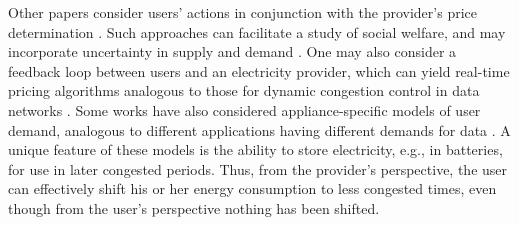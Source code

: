 
Other papers consider users' actions in conjunction with the provider's price determination \cite{borenstein2002dynamic}. Such approaches can facilitate a study of social welfare, and may incorporate uncertainty in supply and demand \cite{brunekreeft2000price,chao1983peak,samadi2010optimal}. One may also consider a feedback loop between users and an electricity provider, which can yield real-time pricing algorithms analogous to those for dynamic congestion control in data networks \cite{roozbehani2010dynamic}.
Some works have also considered appliance-specific models of user demand, analogous to different applications having different demands for data \cite{li2011optimal}. A unique feature of these models is the ability to store electricity, e.g., in batteries, for use in later congested periods. Thus, from the provider's perspective, the user can effectively shift his or her energy consumption to less congested times, even though from the user's perspective nothing has been shifted.